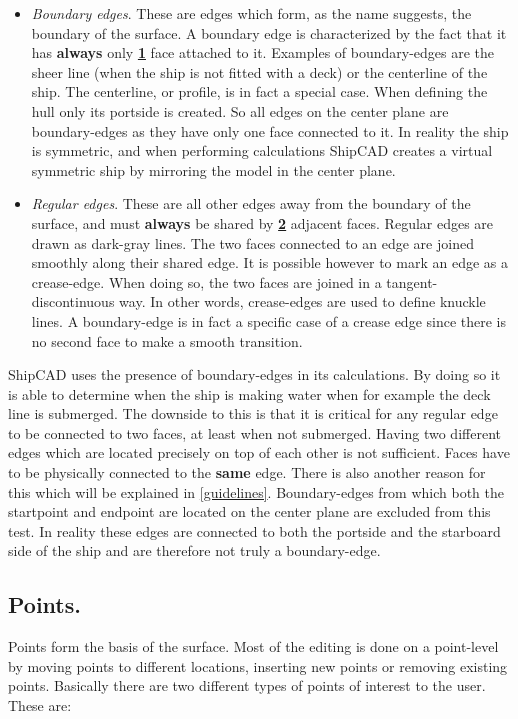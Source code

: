 \documentclass[12pt]{article}
\begin{document}
\begin{itemize}

  \item \textit{Boundary edges}. These are edges which form, as the
  name suggests, the boundary of the surface. A boundary edge is
  characterized by the fact that it has \textbf{always}
  only \underline{\textbf{1}} face attached to it. Examples of
  boundary-edges are the sheer line (when the ship is not fitted with
  a deck) or the centerline of the ship. The centerline, or profile,
  is in fact a special case.  When defining the hull only its portside
  is created. So all edges on the center plane are boundary-edges as
  they have only one face connected to it. In reality the ship is
  symmetric, and when performing calculations ShipCAD creates a
  virtual symmetric ship by mirroring the model in the center plane.

  \item \textit{Regular edges}. These are all other edges away from
  the boundary of the surface, and must \textbf{always} be shared
  by \underline{\textbf{2}} adjacent faces. Regular edges are drawn as
  dark-gray lines. The two faces connected to an edge are joined
  smoothly along their shared edge. It is possible however to mark an
  edge as a crease-edge. When doing so, the two faces are joined in a
  tangent-discontinuous way. In other words, crease-edges are used to
  define knuckle lines. A boundary-edge is in fact a specific case of
  a crease edge since there is no second face to make a smooth
  transition.

\end{itemize}

ShipCAD uses the presence of boundary-edges in its calculations. By
doing so it is able to determine when the ship is making water when
for example the deck line is submerged. The downside to this is that
it is critical for any regular edge to be connected to two faces, at
least when not submerged. Having two different edges which are located
precisely on top of each other is not sufficient. Faces have to be
physically connected to the \textbf{same} edge. There is also another
reason for this which will be explained
in \ref{guidelines}. Boundary-edges from which both the startpoint and
endpoint are located on the center plane are excluded from this test.
In reality these edges are connected to both the portside and the
starboard side of the ship and are therefore not truly a
boundary-edge.

\subsection{Points.}
Points form the basis of the surface. Most of the editing is done on a point-level by moving points to
different locations, inserting new points or removing existing points. Basically there are two different
types of points of interest to the user. These are:
\end{document}
